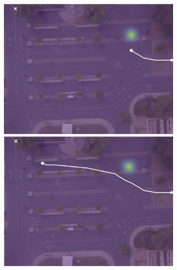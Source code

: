\documentclass[usenames,dvipsnames]{article}
\begin{document}
\begin{enumerate}
\begin{item}
\begin{figure}[t!]
\begin{subfigure}[t]{0.5\textwidth}
	\vspace{0.1cm}
		\begin{minipage}[c]{0.45cm}
		\end{minipage}
		\begin{minipage}[c]{0.3\linewidth}
			\includegraphics[width=\linewidth]{./figures/bookstore/lstm_1_2_t=100.jpg}
		\end{minipage}
		\begin{minipage}[c]{0.3\linewidth}
			\includegraphics[width=\linewidth]{./figures/bookstore/lstm_1_2_t=300.jpg}
		\end{minipage}
		\begin{minipage}[c]{0.3\linewidth}

\end{minipage}
\end{subfigure}
\end{figure}
\end{item}
\end{enumerate}
\end{document}

